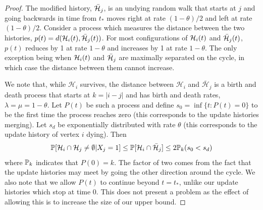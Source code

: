 \begin{proof}
		The modified history, $\bar{\mathcal{H}}_j$, is an undying random walk that starts at $j$ and going backwards in time from $t_*$ moves right at rate $(1 - \theta)/2$ and left at rate $(1 - \theta)/2$. Consider a process which measures the distance between the two histories, $p(t) = d(\mathcal{H}_i(t), \bar{\mathcal{H}}_j(t))$. For most configurations of $\mathcal{H}_i(t)$ and $\bar{\mathcal{H}}_j(t)$, $p(t)$ reduces by 1 at rate $1 - \theta$ and increases by 1 at rate $1 - \theta$. The only exception being when $\mathcal{H}_i(t)$ and $\bar{\mathcal{H}}_j$ are maximally separated on the cycle, in which case the distance between them cannot increase.



		We note that, while $\mathcal{H}_i$ survives, the distance between $\mathcal{H}_i$ and $\bar{\mathcal{H}}_j$ is a birth and death process that starts at $k = |i - j|$ and has birth and death rates, $\lambda = \mu = 1 - \theta$. Let $P(t)$ be such a process and define $s_0  = \inf\{t : P(t) = 0\}$ to be the first time the process reaches zero (this corresponds to the update histories merging). Let $s_d$ be exponentially distributed with rate $\theta$ (this corresponds to the update history of vertex $i$ dying). Then
		\begin{align}
		 	\mathbb{P}[\mathcal{H}_i \cap \mathcal{H}_j \neq \emptyset | X_j = 1] \leq \mathbb{P}[\mathcal{H}_i \cap \bar{\mathcal{H}}_j] \leq 2 \mathbb{P}_k(s_0 < s_d)
		 \end{align} 
		 where $\mathbb{P}_k$ indicates that $P(0) = k$. 
		 The factor of two comes from the fact that the update histories may meet by going the other direction around the cycle. We also note that we allow $P(t)$ to continue beyond $t = t_*$, unlike our update histories which stop at time $0$. This does not present a problem as the effect of allowing this is to increase the size of our upper bound.



\end{proof}
